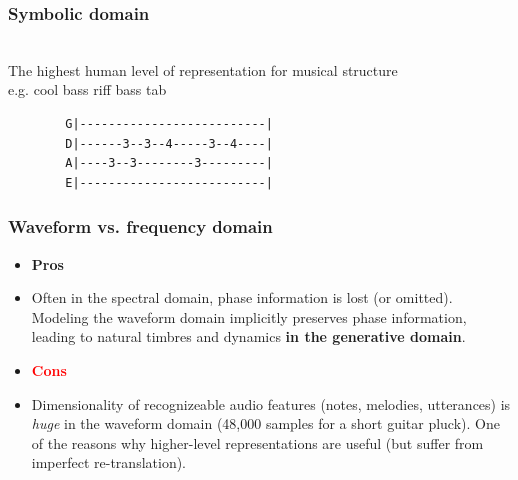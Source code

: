 \documentclass{beamer}
\begin{document}
\begin{frame}[fragile]
	\frametitle{Symbolic domain}
	\ \\
	The highest human level of representation for musical structure\\
	e.g. cool bass riff bass tab 
	\begin{small}
		\begin{verbatim}
		G|--------------------------|
		D|------3--3--4-----3--4----|
		A|----3--3--------3---------|
		E|--------------------------|
		\end{verbatim}
	\end{small}
\end{frame}


\begin{frame}
	\frametitle{Waveform vs. frequency domain}
	\begin{itemize}
		\item[] \textbf{\textcolor{ao(english)}{Pros}}
		\item Often in the spectral domain, phase information is lost (or omitted). Modeling the waveform domain implicitly preserves phase information, leading to natural timbres and dynamics \textbf{in the generative domain}.
	\end{itemize}
	\vspace{1em}
	\begin{itemize}
		\item[] \textbf{\textcolor{red}{Cons}}
		\item Dimensionality of recognizeable audio features (notes, melodies, utterances) is \textit{huge} in the waveform domain (48,000 samples for a short guitar pluck). One of the reasons why higher-level representations are useful (but suffer from imperfect re-translation).
	\end{itemize}
\end{frame}

\end{document}
